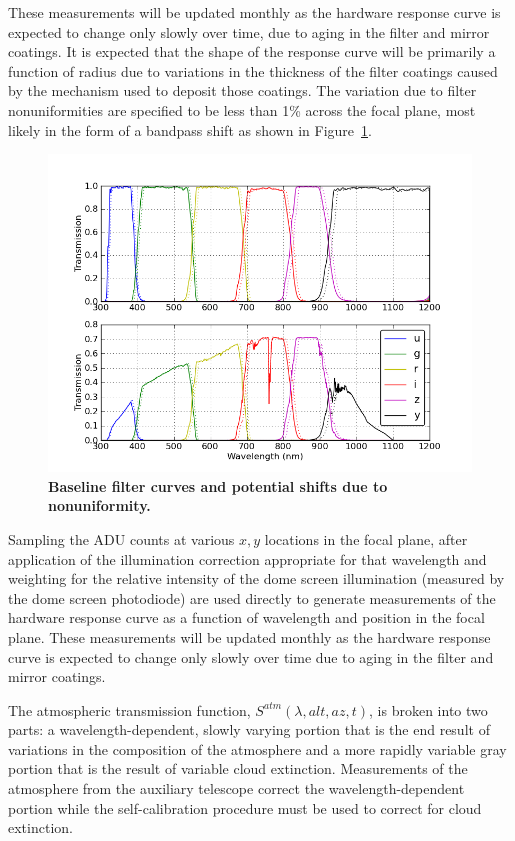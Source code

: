 \documentclass[12pt,preprint]{aastex}
\begin{document}
These measurements will be updated monthly as the hardware response
curve is expected to change only slowly over time, due to aging in the
filter and mirror coatings. It is expected that the shape of the
response curve will be primarily a function of radius due to
variations in the thickness of the filter coatings caused by the
mechanism used to deposit those coatings. The variation due to filter
nonuniformities are specified to be less than 1\% across the focal
plane, most likely in the form of a bandpass shift as shown in
Figure~\ref{fig:filtershift}.

\begin{figure}
\begin{center}
\includegraphics[width=6in]{filter_shifts}
\end{center}
\caption{{\small 
{\bf Baseline filter curves and potential shifts due to nonuniformity.}
}}
\label{fig:filtershift}
\end{figure}


Sampling the ADU counts at various $x,y$ locations in the focal plane, 
after application of the illumination correction appropriate for that wavelength
and weighting for the relative intensity of the dome screen illumination 
(measured by the dome screen photodiode)
 are used directly to generate measurements of the
hardware response curve as a function of wavelength and position in
the focal plane. These measurements will be updated monthly as the
hardware response curve is expected to change only slowly over time
due to aging in the filter and mirror coatings.

The atmospheric transmission function, $S^{atm}(\lambda,alt,az,t)$, is
broken into two parts: a wavelength-dependent, slowly varying portion
that is the end result of variations in the composition of the
atmosphere and a more rapidly variable gray portion that is the result
of variable cloud extinction. Measurements of the atmosphere from the
auxiliary telescope correct the wavelength-dependent portion while the
self-calibration procedure must be used to correct for cloud
extinction. 
\end{document}
